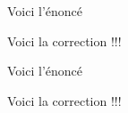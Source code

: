 \documentclass[12pt,oneside]{report}
\newcommand{\exoquatre}{1\,} %
\newcommand{\exocinq}{2\,} %
\begin{document}
\begin{spacing}{1.2}
\label{exo4}
\begin{Exercice}[(\exoquatre points)]%
\begin{Enonce}
Voici l'énoncé
\end{Enonce}

\begin{Correction}
Voici la correction !!!
\end{Correction}
\end{Exercice}

\label{exo5}
\begin{Exercice}[(\exocinq points)]%
\begin{Enonce}
Voici l'énoncé
\end{Enonce}

\begin{Correction}
Voici la correction !!!
\end{Correction}
\end{Exercice}

\end{spacing}
\end{document}
